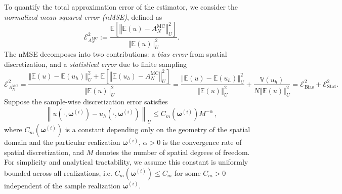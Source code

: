 To quantify the total approximation error of the estimator, we consider the  {\it normalized mean squared error (nMSE)}, defined as
%
 \[
\mathcal{E}_{A^{\text{MC}}_{N}}^2:=\frac{\mathbb E\left[\left\Vert\mathbb{E}(u)-A^{\text{MC}}_{N} \right\Vert_{U}^2\right]}{\left\Vert\mathbb{E}(u) \right\Vert_{U}^2}.
\] 
%
The nMSE decomposes into two contributions: a {\it bias error} from spatial discretization, and a {\it statistical error} due to finite sampling
%
\[
\mathcal{E}_{A^{\text{MC}}_{N}}^2 = \frac{\left\Vert\mathbb{E}(u)-\mathbb{E}(u_{h}) \right\Vert_{U}^2+\mathbb E\left[\left\Vert \mathbb{E}(u_{h}) -A^{\text{MC}}_{N} \right\Vert_{U}^2\right]}{\left\Vert\mathbb{E}(u) \right\Vert_{U}^2} = \frac{\left\Vert\mathbb{E}(u)-\mathbb{E}(u_{h}) \right\Vert_{U}^2}{\left\Vert\mathbb{E}(u) \right\Vert_{U}^2}+\frac{\mathbb{V}\left( u_{h}\right)}{N\left\Vert\mathbb{E}(u) \right\Vert_{U}^2}=\mathcal{E}_{\text{Bias}}^2 + \mathcal{E}_{\text{Stat}}^2.
\]
%
Suppose the sample-wise discretization error satisfies
%
\begin{equation*} \label{eq:Assumption_uhA}
\left\|u\left(\cdot, \boldsymbol\omega^{(i)}\right)-u_h\left(\cdot,\boldsymbol\omega^{(i)}\right)\right\|_U\leq C_m\left(\boldsymbol\omega^{(i)}\right)M^{-\alpha}\,,
\end{equation*}
%
where $C_m(\boldsymbol\omega^{(i)})$ is a constant depending only on the geometry of the spatial domain and the particular realization $\boldsymbol\omega^{(i)}$, $\alpha>0$ is the convergence rate of spatial discretization, and $M$ denotes the number of spatial degrees of freedom. For simplicity and analytical tractability, we assume this constant is uniformly bounded across all realizations, i.e. $C_m(\boldsymbol\omega^{(i)})\le C_m$ for some $C_m>0$ independent of the sample realization $\boldsymbol\omega^{(i)}$.


